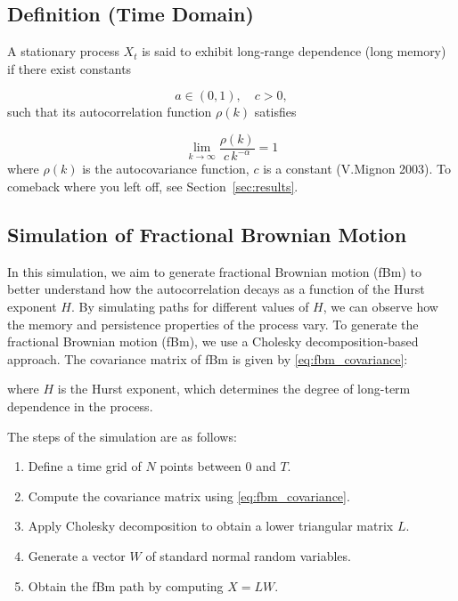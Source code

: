 \documentclass[11pt]{extarticle}
\begin{document}
\FloatBarrier

\subsection{Definition (Time Domain)}
\label{sec:long_range_dependence}
A stationary process \(X_t\) is said to exhibit long‐range dependence (long memory) if there exist constants

\[
a\in(0,1),\quad c>0,
\]
such that its autocorrelation function \(\rho(k)\) satisfies

\begin{equation}
\lim_{k \to \infty}
\frac{\rho(k)}{c\,k^{-\alpha}}
=1
\end{equation}
where \(\rho(k)\) is the autocovariance function, \(c\) is a constant (V.Mignon 2003). To comeback where you left off,
see Section~\ref{sec:results}.


\subsection{Simulation of Fractional Brownian Motion}
\label{sec:simulation_fbm}

In this simulation, we aim to generate fractional Brownian motion (fBm) to better understand how the autocorrelation
decays as a function of the Hurst exponent \( H \). By simulating paths for different values of \( H \), we can observe
how the memory and persistence properties of the process vary.
To generate the fractional Brownian motion (fBm), we use a Cholesky decomposition-based approach. The covariance matrix of fBm is given by \eqref{eq:fbm_covariance}:

where \( H \) is the Hurst exponent, which determines the degree of long-term dependence in the process.

The steps of the simulation are as follows:
\begin{enumerate}
    \item Define a time grid of \( N \) points between \( 0 \) and \( T \).
    \item Compute the covariance matrix using \eqref{eq:fbm_covariance}.
    \item Apply Cholesky decomposition to obtain a lower triangular matrix \( L \).
    \item Generate a vector \( W \) of standard normal random variables.
    \item Obtain the fBm path by computing \( X = L W \).
\end{enumerate}
\end{document}
